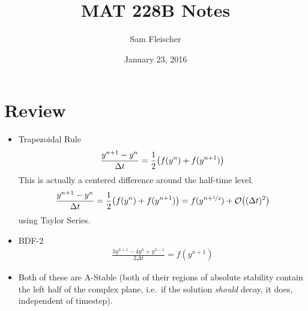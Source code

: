 \documentclass{article}
\title{MAT 228B Notes}
\author{Sam Fleischer}
\date{January 23, 2016}
\newcommand{\half}{\nicefrac{1}{2}}
\newcommand{\Dt}{\Delta t}
\begin{document}
    \maketitle

    \section{Review}
        \begin{itemize}
            \item Trapezoidal Rule
            \begin{align*}
                \frac{y^{n+1} - y^n}{\Dt} = \frac{1}{2}\qty(f(y^n) + f(y^{n+1}))
            \end{align*}
            This is actually a centered difference around the half-time level.
            \begin{align*}
                \frac{y^{n+1} - y^n}{\Dt} = \frac{1}{2}\qty(f(y^n) + f(y^{n+1})) = f(y^{n+\half}) + \order{(\Dt)^2}
            \end{align*}
            using Taylor Series.
            \item BDF-2
            \begin{align*}
                \frac{3y^{n+1} - 4y^n + y^{n-1}}{2\Dt} = f(y^{n+1})
            \end{align*}
            \item Both of these are A-Stable (both of their regions of absolute stability contain the left half of the complex plane, i.e.~if the solution \emph{should} decay, it does, independent of timestep).
        \end{itemize}
\end{document}
